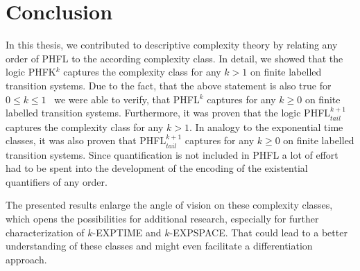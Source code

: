 \chapter{Conclusion}

In this thesis, we contributed to descriptive complexity theory by relating any order of PHFL to the according complexity class. In detail, we showed that the logic PHFK$^k$ captures the complexity class  for any $k > 1$ on finite labelled transition systems. Due to the fact, that the above statement is also true for $0 \leq k \leq 1$~\cite{lange2014capturing} we were able to verify, that PHFL$^k$ captures  for any $k \geq 0$ on finite labelled transition systems. Furthermore, it was proven that the logic PHFL$^{k+1}_{tail}$ captures the complexity class  for any $k > 1$. In analogy to the exponential time classes, it was also proven that PHFL$^{k+1}_{tail}$ captures  for any $k \geq 0$ on finite labelled transition systems.
Since quantification is not included in PHFL a lot of effort had to be spent into the development of the encoding of the existential quantifiers of any order.

The presented results enlarge the angle of vision on these complexity classes, which opens the possibilities for additional research, especially for further characterization of $k$-EXPTIME and $k$-EXPSPACE. That could lead to a better understanding of these classes and might even facilitate a differentiation approach.
